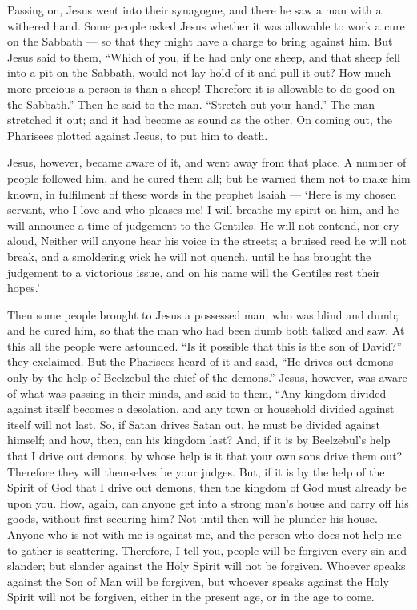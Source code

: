 Passing on, Jesus went into their synagogue, 
and there he saw a man with a withered hand. Some people asked Jesus
whether it was allowable to work a cure on the Sabbath --- so that they
might have a charge to bring against him.  But Jesus said
to them, ``Which of you, if he had only one sheep, and that sheep fell
into a pit on the Sabbath, would not lay hold of it and pull it out?
 How much more precious a person is than a sheep! Therefore
it is allowable to do good on the Sabbath.''  Then he said
to the man. ``Stretch out your hand.'' The man stretched it out; and it
had become as sound as the other.  On coming out, the
Pharisees plotted against Jesus, to put him to death.

 Jesus, however, became aware of it, and went away from
that place. A number of people followed him, and he cured them all;
 but he warned them not to make him known,  in
fulfilment of these words in the prophet Isaiah ---  `Here
is my chosen servant, who I love and who pleases me! I will breathe my
spirit on him, and he will announce a time of judgement to the Gentiles.
 He will not contend, nor cry aloud, Neither will anyone
hear his voice in the streets;  a bruised reed he will not
break, and a smoldering wick he will not quench, until he has brought
the judgement to a victorious issue,  and on his name will
the Gentiles rest their hopes.'

 Then some people brought to Jesus a possessed man, who was
blind and dumb; and he cured him, so that the man who had been dumb both
talked and saw.  At this all the people were astounded.
``Is it possible that this is the son of David?'' they exclaimed.
 But the Pharisees heard of it and said, ``He drives out
demons only by the help of Beelzebul the chief of the demons.''
 Jesus, however, was aware of what was passing in their
minds, and said to them, ``Any kingdom divided against itself becomes a
desolation, and any town or household divided against itself will not
last.  So, if Satan drives Satan out, he must be divided
against himself; and how, then, can his kingdom last?  And,
if it is by Beelzebul's help that I drive out demons, by whose help is
it that your own sons drive them out? Therefore they will themselves be
your judges.  But, if it is by the help of the Spirit of
God that I drive out demons, then the kingdom of God must already be
upon you.  How, again, can anyone get into a strong man's
house and carry off his goods, without first securing him? Not until
then will he plunder his house.  Anyone who is not with me
is against me, and the person who does not help me to gather is
scattering.  Therefore, I tell you, people will be forgiven
every sin and slander; but slander against the Holy Spirit will not be
forgiven.  Whoever speaks against the Son of Man will be
forgiven, but whoever speaks against the Holy Spirit will not be
forgiven, either in the present age, or in the age to come.

